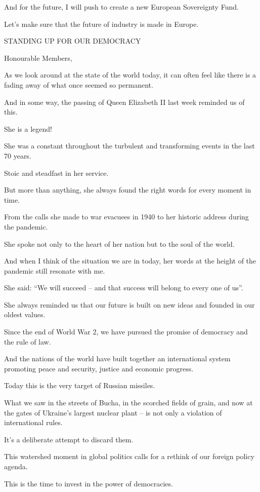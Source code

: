 \documentclass[a4paper,11pt]{article}
\begin{document}
And for the future, I will push to create a new European Sovereignty Fund.

Let's make sure that the future of industry is made in Europe.

 

STANDING UP FOR OUR DEMOCRACY

Honourable Members,

As we look around at the state of the world today, it can often feel like there is a fading away of what once seemed so permanent.

And in some way, the passing of Queen Elizabeth II last week reminded us of this. 

She is a legend!

She was a constant throughout the turbulent and transforming events in the last 70 years.

Stoic and steadfast in her service.

But more than anything, she always found the right words for every moment in time.

From the calls she made to war evacuees in 1940 to her historic address during the pandemic.

She spoke not only to the heart of her nation but to the soul of the world.

And when I think of the situation we are in today, her words at the height of the pandemic still resonate with me.

She said: “We will succeed – and that success will belong to every one of us”.

She always reminded us that our future is built on new ideas and founded in our oldest values.

Since the end of World War 2, we have pursued the promise of democracy and the rule of law.

And the nations of the world have built together an international system promoting peace and security, justice and economic progress.

Today this is the very target of Russian missiles.

What we saw in the streets of Bucha, in the scorched fields of grain, and now at the gates of Ukraine's largest nuclear plant – is not only a violation of international rules.

It's a deliberate attempt to discard them.

This watershed moment in global politics calls for a rethink of our foreign policy agenda.

This is the time to invest in the power of democracies.
\end{document}
